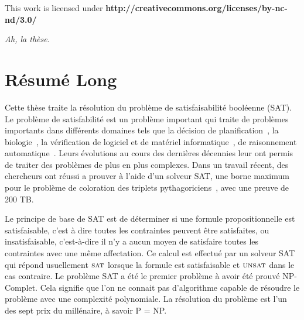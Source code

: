 ﻿\clearpage\null\vfill
\thispagestyle{empty}
\begin{minipage}[b]{.9\textwidth}
  \begin{center}
  \setlength{\parskip}{.5\baselineskip}
  {\color{phdcol0}%
   \ccLogo\hspace{.1cm}%
   \ccAttribution\hspace{.1cm}%
   \ccNonCommercial\hspace{.1cm}%
   \ccNoDerivatives}\hspace{.15cm}%
  \footnotesize%
  This work is licensed under {\color{phdcol1}\textbf{http://creativecommons.org/licenses/by-nc-nd/3.0/}}
  \end{center}
\end{minipage}
\vspace*{2\baselineskip}

\clearpage

\thispagestyle{empty}
\begin{flushright}
  \textit{Ah, la thèse.}
\end{flushright}
%
%
%

%
\chapter*{Résumé Long}


Cette thèse traite la résolution du problème de satisfaisabilité booléenne (SAT).
Le problème de satisfabilité est un problème important qui traite de problèmes importants dans différents domaines tels 
que la décision de planification~\cite{planning_92}, la biologie~\cite{biology_06}, la vérification de logiciel et de 
matériel informatique~\cite{biere1999symbolic}, de raisonnement automatique~\cite{heule2016solving}.
Leurs évolutions au cours des dernières décennies leur ont permis de traiter des problèmes de plus en plus complexes.
Dans un travail récent, des chercheurs ont réussi a prouver à l'aide d'un solveur SAT, une borne maximum
pour le problème de coloration des triplets pythagoriciens~\cite{heule2016solving}, avec une preuve de 200 TB.


Le principe de base de SAT est de déterminer si une formule propositionnelle
est satisfaisable, c'est à dire toutes les contraintes peuvent être satisfaites,
ou insatisfaisable, c'est-à-dire il n'y a aucun moyen de satisfaire toutes les contraintes avec une même affectation.
Ce calcul est effectué par un solveur SAT qui répond usuellement $\textsc{sat}$ lorsque la formule est satisfaisable et $\textsc{unsat}$ dans le cas
contraire.
Le problème SAT a été le premier problème à avoir été prouvé NP-Complet. Cela signifie que
l'on ne connait pas d'algorithme capable de résoudre le problème avec une complexité polynomiale.
La résolution du problème est l'un des sept prix du millénaire, à savoir P = NP.


